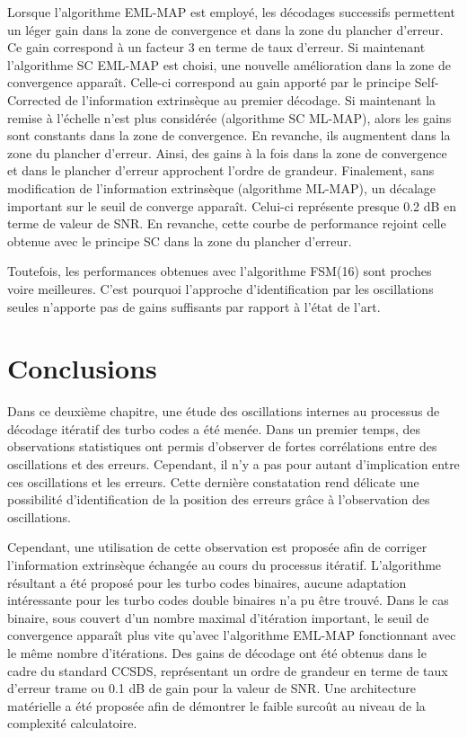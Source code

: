 Lorsque l'algorithme EML-MAP est employé, les décodages successifs permettent un léger gain dans la zone de convergence 
et dans la zone du plancher d'erreur. Ce gain correspond à un facteur 3 en terme de taux d'erreur. Si maintenant l'algorithme SC EML-MAP 
est  choisi, une nouvelle amélioration dans la zone de convergence apparaît. Celle-ci correspond au gain apporté par le 
principe Self-Corrected de l'information extrinsèque au premier décodage. Si maintenant la remise à l'échelle n'est plus 
considérée (algorithme SC ML-MAP), alors les gains sont constants dans la zone de convergence. En revanche, ils augmentent dans 
la zone du plancher d'erreur. Ainsi, des gains à la fois dans la zone de convergence et dans le plancher d'erreur 
approchent l'ordre de grandeur. Finalement, sans modification de l'information extrinsèque 
(algorithme ML-MAP), un décalage important sur le seuil de converge apparaît. Celui-ci représente presque 0.2 dB en terme 
de valeur de SNR. En revanche, cette courbe de performance rejoint celle obtenue avec le principe SC dans la zone du 
plancher d'erreur. 

Toutefois, les performances obtenues avec l'algorithme FSM(16) sont proches voire meilleures. C'est pourquoi l'approche 
d'identification par les oscillations seules n'apporte pas de gains suffisants par rapport à l'état de l'art.

\section{Conclusions}
Dans ce deuxième chapitre, une étude des oscillations internes au processus de décodage itératif des turbo codes a été 
menée. Dans un premier temps, des observations statistiques ont permis d'observer de fortes corrélations entre des oscillations
et des erreurs. Cependant, il n'y a pas pour autant d'implication entre ces oscillations et les erreurs. Cette dernière constatation 
rend délicate une possibilité d'identification de la position des erreurs grâce à l'observation des oscillations.

Cependant, une utilisation de cette observation est proposée afin de corriger l'information extrinsèque échangée au 
cours du processus itératif. L'algorithme résultant a été proposé pour les turbo codes binaires, aucune adaptation intéressante 
pour les turbo codes double binaires n'a pu être trouvé. Dans le cas binaire, sous couvert d'un nombre maximal d'itération
important, le seuil de convergence apparaît plus vite qu'avec l'algorithme EML-MAP fonctionnant avec le même nombre 
d'itérations. Des gains de décodage ont été obtenus dans le cadre du standard CCSDS, représentant un ordre de grandeur en terme de taux d'erreur trame 
ou 0.1 dB de gain pour la valeur de SNR. Une architecture matérielle a été proposée afin de démontrer le faible surcoût au niveau de la complexité
calculatoire.

